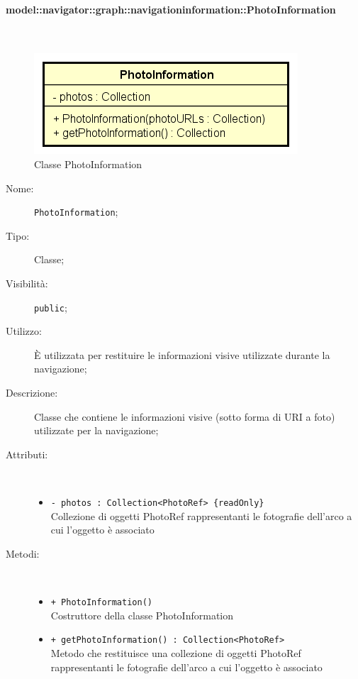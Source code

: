 \documentclass[../DefinizioneDiProdotto.tex]{subfiles}
\begin{document}
\paragraph{model::navigator::graph::navigationinformation::PhotoInformation}
\
\begin{figure}[H]
	\centering
	\includegraphics[width=\maxwidth]{img/PhotoInformation.png}
	\caption{Classe PhotoInformation}\label{fig:model::navigator::graph::navigationinformation::PhotoInformation} 
\end{figure}
\begin{description}
	\item[Nome:] \texttt{PhotoInformation};
	\item[Tipo:] Classe;
	\item[Visibilità:] \texttt{public};
	\item[Utilizzo:] È utilizzata per restituire le informazioni visive utilizzate durante la navigazione;
	\item[Descrizione:] Classe che contiene le informazioni visive (sotto forma di URI a foto) utilizzate per la navigazione;
	\item[Attributi:] \
	\begin{itemize}
		\item \texttt{- photos : Collection<PhotoRef> \{readOnly\}}\\
		Collezione di oggetti PhotoRef rappresentanti le fotografie dell'arco a cui l'oggetto è associato
		
	\end{itemize}
	\item[Metodi:] \
	\begin{itemize}
		\item \texttt{+ PhotoInformation()}\\
		Costruttore della classe PhotoInformation
		\item \texttt{+ getPhotoInformation() : Collection<PhotoRef>}\\
		Metodo che restituisce una collezione di oggetti PhotoRef rappresentanti le fotografie dell'arco a cui l'oggetto è associato
	\end{itemize}
\end{description}
\end{document}
